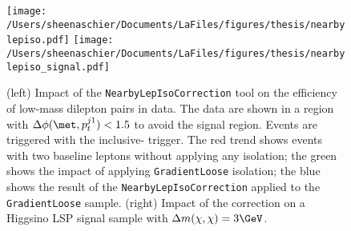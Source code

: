  \begin{figure}[tbp]
  \texttt{[image: /Users/sheenaschier/Documents/LaFiles/figures/thesis/nearbylepiso.pdf]}
   \texttt{[image: /Users/sheenaschier/Documents/LaFiles/figures/thesis/nearbylepiso\_signal.pdf]}
  \caption{(left) Impact of the \texttt{NearbyLepIsoCorrection} tool on the efficiency of low-mass dilepton pairs in data.  The data are shown in a region with $\Delta\phi(\met, p_{t}^{j1})<1.5$ to avoid the signal region.  Events are triggered with the inclusive-\met{} trigger.  The red trend shows events with two baseline leptons without applying any isolation; the green shows the impact of applying \texttt{GradientLoose} isolation; the blue shows the result of the \texttt{NearbyLepIsoCorrection} applied to the \texttt{GradientLoose} sample.  (right) Impact of the correction on a Higgsino LSP signal sample with $\Delta m(\chi,\chi)=3\GeV$.}
 \label{fig:nearbylepiso}
 \end{figure}
 

 
 


